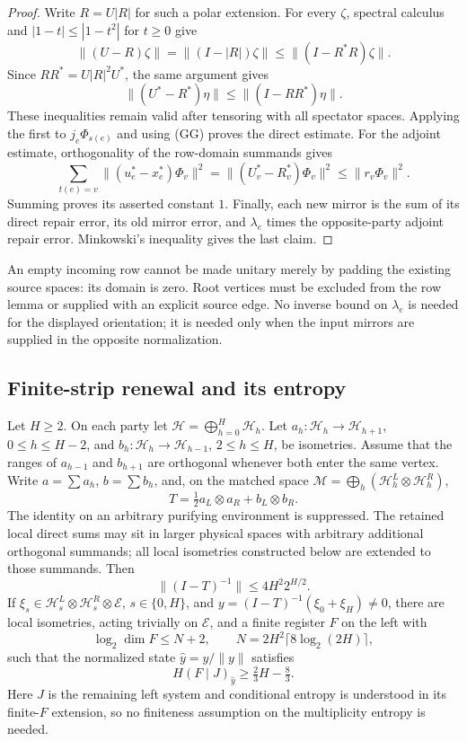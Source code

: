 \begin{proof}
Write $R=U|R|$ for such a polar extension. For every $\zeta$, spectral calculus and $|1-t|\le|1-t^2|$ for $t\ge0$ give
\[
 \|(U-R)\zeta\|=\|(I-|R|)\zeta\|\le\|(I-R^*R)\zeta\|.
\]
Since $RR^*=U|R|^2U^*$, the same argument gives
\[
 \|(U^*-R^*)\eta\|\le\|(I-RR^*)\eta\|.
\]
These inequalities remain valid after tensoring with all spectator spaces. Applying the first to $j_e\Phi_{s(e)}$ and using (GG) proves the direct estimate. For the adjoint estimate, orthogonality of the row-domain summands gives
\[
 \sum_{t(e)=v}\|(u_e^*-x_e^*)\Phi_v\|^2
 =\|(U_v^*-R_v^*)\Phi_v\|^2\le\|r_v\Phi_v\|^2.
\]
Summing proves its asserted constant $1$. Finally, each new mirror is the sum of its direct repair error, its old mirror error, and $\lambda_e$ times the opposite-party adjoint repair error. Minkowski's inequality gives the last claim.
\end{proof}

\begin{remark}
An empty incoming row cannot be made unitary merely by padding the existing source spaces: its domain is zero. Root vertices must be excluded from the row lemma or supplied with an explicit source edge. No inverse bound on $\lambda_e$ is needed for the displayed orientation; it is needed only when the input mirrors are supplied in the opposite normalization.
\end{remark}
\subsection{Finite-strip renewal and its entropy}\label{rnd:sec:renewal}

\begin{lemma}\label{rnd:lem:renewal}
Let $H\ge2$. On each party let $\mathcal H=\bigoplus_{h=0}^H\mathcal H_h$.
Let $a_h:\mathcal H_h\to\mathcal H_{h+1}$, $0\le h\le H-2$, and
$b_h:\mathcal H_h\to\mathcal H_{h-1}$, $2\le h\le H$, be isometries.
Assume that the ranges of $a_{h-1}$ and $b_{h+1}$ are orthogonal whenever
both enter the same vertex. Write $a=\sum a_h$, $b=\sum b_h$, and, on the
matched space $\mathcal M=\bigoplus_h(\mathcal H_h^L\otimes\mathcal H_h^R)$,
\[
 T=\tfrac12a_L\otimes a_R+b_L\otimes b_R.
\]
The identity on an arbitrary purifying environment is suppressed. The retained local direct sums may sit in larger physical spaces with arbitrary additional orthogonal summands; all local isometries constructed below are extended to those summands. Then
\[
 \|(I-T)^{-1}\|\le 4H^2 2^{H/2}.
\]
If $\xi_s\in\mathcal H_s^L\otimes\mathcal H_s^R\otimes\mathcal E$,
$s\in\{0,H\}$, and $y=(I-T)^{-1}(\xi_0+\xi_H)\ne0$, there are local
isometries, acting trivially on $\mathcal E$, and a finite register $F$
on the left with
\[
 \log_2\dim F\le N+2,\qquad
 N=2H^2\lceil8\log_2(2H)\rceil,
\]
such that the normalized state $\widehat y=y/\|y\|$ satisfies
\[
 H(F\mid J)_{\widehat y}\ge\tfrac23H-\tfrac83.
\]
Here $J$ is the remaining left system and conditional entropy is understood
in its finite-$F$ extension, so no finiteness assumption on the multiplicity
entropy is needed.
\end{lemma}

